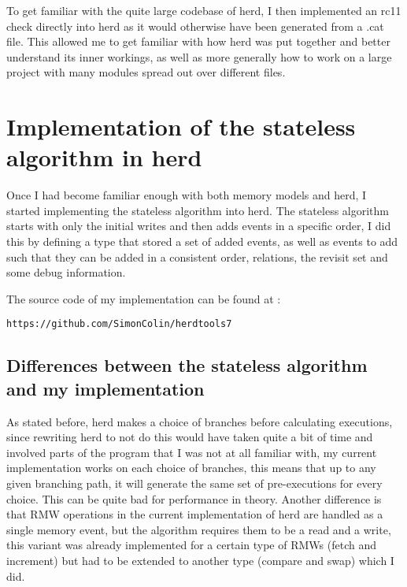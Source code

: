 \documentclass[a4,11pt,dvipsnames]{article}
\begin{document}
To get familiar with the quite large codebase of herd, I then implemented an rc11 check directly into herd as it would otherwise have been generated from a .cat file. This allowed me to get familiar with how herd was put together and better understand its inner workings, as well as more generally how to work on a large project with many modules spread out over different files.

\section{Implementation of the stateless algorithm in herd}

Once I had become familiar enough with both memory models and herd, I started implementing the stateless algorithm into herd. The stateless algorithm starts with only the initial writes and then adds events in a specific order, I did this by defining a type that stored a set of added events, as well as events to add such that they can be added in a consistent order, relations, the revisit set and some debug information.

The source code of my implementation can be found at :
\begin{lstlisting}
https://github.com/SimonColin/herdtools7
\end{lstlisting}

\subsection{Differences between the stateless algorithm and my implementation}

As stated before, herd makes a choice of branches before calculating executions, since rewriting herd to not do this would have taken quite a bit of time and involved parts of the program that I was not at all familiar with, my current implementation works on each choice of branches, this means that up to any given branching path, it will generate the same set of pre-executions for every choice. This can be quite bad for performance in theory. Another difference is that RMW operations in the current implementation of herd are handled as a single memory event, but the algorithm requires them to be a read and a write, this variant was already implemented for a certain type of RMWs (fetch and increment) but had to be extended to another type (compare and swap) which I did.

\end{document}
